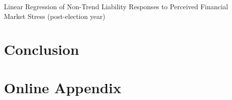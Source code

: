 \documentclass[]{article}
\begin{document}
\begin{table}
    \caption{Linear Regression of Non-Trend Liability Responses to Perceived Financial Market Stress (post-election year)}
    \label{t1_stress}

    \begin{center}
        
    \end{center}

\end{table}


\section*{Conclusion}







\section{Online Appendix}


\end{document}
